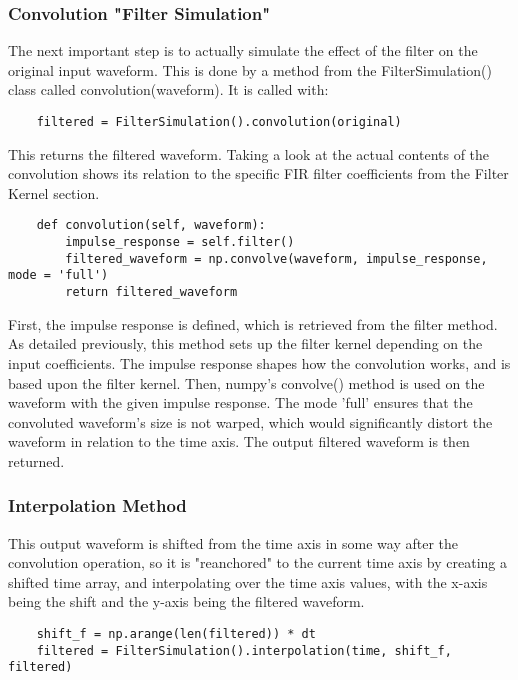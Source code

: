 \subsubsection{Convolution "Filter Simulation"}

The next important step is to actually simulate the effect of the filter on the original input waveform. This is done by a method from the FilterSimulation() class called convolution(waveform). It is called with:

\begin{verbatim}
    filtered = FilterSimulation().convolution(original)
\end{verbatim}

This returns the filtered waveform. Taking a look at the actual contents of the convolution shows its relation to the specific FIR filter coefficients from the Filter Kernel section.

\begin{verbatim}
    def convolution(self, waveform):
        impulse_response = self.filter()
        filtered_waveform = np.convolve(waveform, impulse_response, mode = 'full')
        return filtered_waveform
\end{verbatim}

First, the impulse response is defined, which is retrieved from the filter method. As detailed previously, this method sets up the filter kernel depending on the input coefficients. The impulse response shapes how the convolution works, and is based upon the filter kernel. Then, numpy's convolve() method is used on the waveform with the given impulse response. The mode 'full' ensures that the convoluted waveform's size is not warped, which would significantly distort the waveform in relation to the time axis. The output filtered waveform is then returned.

\subsubsection{Interpolation Method}

This output waveform is shifted from the time axis in some way after the convolution operation, so it is "reanchored" to the current time axis by creating a shifted time array, and interpolating over the time axis values, with the x-axis being the shift and the y-axis being the filtered waveform.

\begin{verbatim}
    shift_f = np.arange(len(filtered)) * dt
    filtered = FilterSimulation().interpolation(time, shift_f, filtered)
\end{verbatim}


